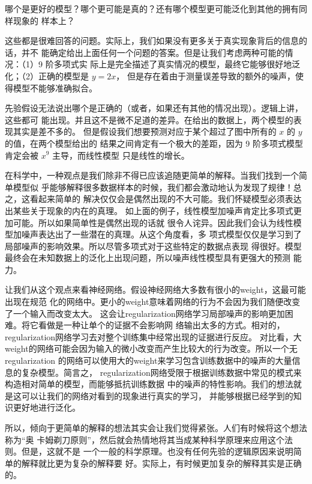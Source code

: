 哪个是更好的模型？哪个更可能是真的？还有哪个模型更可能泛化到其他的拥有同样现象的
样本上？

这些都是很难回答的问题。实际上，我们如果没有更多关于真实现象背后的信息的话，并不
能确定给出上面任何一个问题的答案。但是让我们考虑两种可能的情况：（1）9 阶多项式实
际上是完全描述了真实情况的模型，最终它能够很好地泛化；（2）正确的模型是 $y=2x$，
但是存在着由于测量误差导致的额外的噪声，使得模型不能够准确拟合。

先验假设无法说出哪个是正确的（或者，如果还有其他的情况出现）。逻辑上讲，这些都可
能出现。并且这不是微不足道的差异。在给出的数据上，两个模型的表现其实是差不多的。
但是假设我们想要预测对应于某个超过了图中所有的 $x$ 的 $y$ 的值，在两个模型给出的
结果之间肯定有一个极大的差距，因为 9 阶多项式模型肯定会被 $x^9$ 主导，而线性模型
只是线性的增长。

在科学中，一种观点是我们除非不得已应该追随更简单的解释。当我们找到一个简单模型似
乎能够解释很多数据样本的时候，我们都会激动地认为发现了规律！总之，这看起来简单的
解决仅仅会是偶然出现的不大可能。我们怀疑模型必须表达出某些关于现象的内在的真理。
如上面的例子，线性模型加噪声肯定比多项式更加可能。所以如果简单性是偶然出现的话就
很令人诧异。因此我们会认为线性模型加噪声表达出了一些潜在的真理。从这个角度看，多
项式模型仅仅是学习到了局部噪声的影响效果。所以尽管多项式对于这些特定的数据点表现
得很好。模型最终会在未知数据上的泛化上出现问题，所以噪声线性模型具有更强大的预测
能力。

让我们从这个观点来看神经网络。假设神经网络大多数有很小的\gls*{weight}，这最可能出现在规范
化的网络中。更小的\gls*{weight}意味着网络的行为不会因为我们随便改变了一个输入而改变太大。
这会让\gls*{regularization}网络学习局部噪声的影响更加困难。将它看做是一种让单个的证据不会影响网
络输出太多的方式。相对的，\gls*{regularization}网络学习去对整个训练集中经常出现的证据进行反应。
对比看，大\gls*{weight}的网络可能会因为输入的微小改变而产生比较大的行为改变。所以一个无\gls*{regularization}%
的网络可以使用大的\gls*{weight}来学习包含训练数据中的噪声的大量信息的复杂模型。简言之，
\gls*{regularization}网络受限于根据训练数据中常见的模式来构造相对简单的模型，而能够抵抗训练数据
中的噪声的特性影响。我们的想法就是这可以让我们的网络对看到的现象进行真实的学习，
并能够根据已经学到的知识更好地进行泛化。

所以，倾向于更简单的解释的想法其实会让我们觉得紧张。人们有时候将这个想法称为“奥
卡姆剃刀原则”，然后就会热情地将其当成某种科学原理来应用这个法则。但是，这就不是
一个一般的科学原理。也没有任何先验的逻辑原因来说明简单的解释就比更为复杂的解释要
好。实际上，有时候更加复杂的解释其实是正确的。

